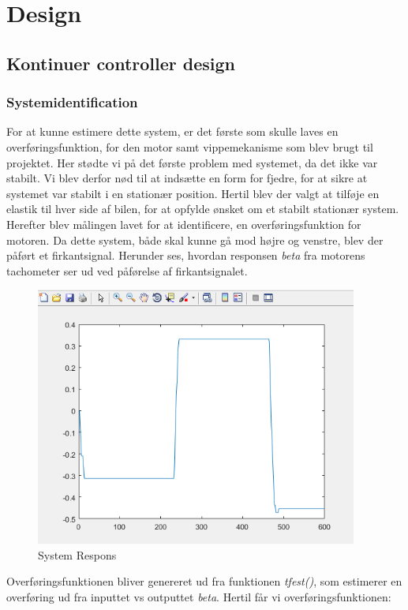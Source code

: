 \section{Design}


\subsection{Kontinuer controller design}
\subsubsection{Systemidentification}

For at kunne estimere dette system, er det første som skulle laves en overføringsfunktion, for den motor samt vippemekanisme som blev brugt til projektet. Her stødte vi på det første problem med systemet, da det ikke var stabilt. Vi blev derfor nød til at indsætte en form for fjedre, for at sikre at systemet var stabilt i en stationær position. Hertil blev der valgt at tilføje en elastik til hver side af bilen, for at opfylde ønsket om et stabilt stationær system. 
Herefter blev målingen lavet for at identificere, en overføringsfunktion for motoren. Da dette system, både skal kunne gå mod højre og venstre, blev der påført et firkantsignal. Herunder ses, hvordan responsen \textit{beta} fra motorens tachometer ser ud ved påførelse af firkantsignalet.      


\begin{figure}[H]
	\centering
	\includegraphics[width = 300pt]{figur/system_respons}
	\caption{System Respons}
	\label{fig:system_respons}
\end{figure}


Overføringsfunktionen bliver genereret ud fra funktionen \textit{tfest()}, som estimerer en overføring ud fra inputtet vs outputtet \textit{beta}. Hertil får vi overføringsfunktionen:

